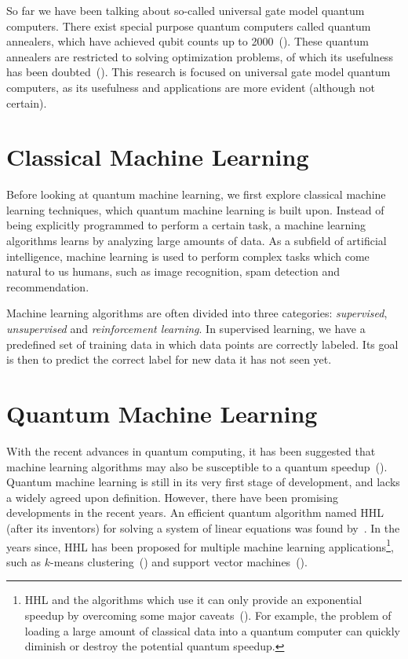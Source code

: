 \documentclass[a4paper,10pt]{article}
\begin{document}
So far we have been talking about so-called universal gate model quantum computers.
There exist special purpose quantum computers called quantum annealers, which have achieved qubit counts up to 2000~(\cite{dwave-2000}).
These quantum annealers are restricted to solving optimization problems, of which its usefulness has been doubted~(\cite{how-quantum-dwave, aaronson-dwave, detecting-quantum-speedup}).
This research is focused on universal gate model quantum computers, as its usefulness and applications are more evident (although not certain).

\section{Classical Machine Learning} \label{sec:classical-ml}
Before looking at quantum machine learning, we first explore classical machine learning techniques, which quantum machine learning is built upon.
Instead of being explicitly programmed to perform a certain task, a machine learning algorithms learns by analyzing large amounts of data.
As a subfield of artificial intelligence, machine learning is used to perform complex tasks which come natural to us humans, such as image recognition, spam detection and recommendation.

Machine learning algorithms are often divided into three categories: \emph{supervised}, \emph{unsupervised} and \emph{reinforcement learning}.
In supervised learning, we have a predefined set of training data in which data points are correctly labeled.
Its goal is then to predict the correct label for new data it has not seen yet.

\section{Quantum Machine Learning} \label{sec:quantum-ml}
With the recent advances in quantum computing, it has been suggested that machine learning algorithms may also be susceptible to a quantum speedup~(\cite{lee2019experimental, lloyd2013quantum, gao2018quantum}).
Quantum machine learning is still in its very first stage of development, and lacks a widely agreed upon definition.
However, there have been promising developments in the recent years.
An efficient quantum algorithm named HHL (after its inventors) for solving a system of linear equations was found by~\cite{harrow2009quantum}.
In the years since, HHL has been proposed for multiple machine learning applications\footnote{HHL and the algorithms which use it can only provide an exponential speedup by overcoming some major caveats~(\cite{aaronson2015read}). For example, the problem of loading a large amount of classical data into a quantum computer can quickly diminish or destroy the potential quantum speedup.}, such as $k$-means clustering~(\cite{lloyd2013quantum}) and support vector machines~(\cite{rebentrost2014quantum}).
\end{document}
